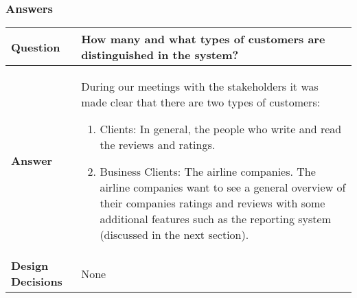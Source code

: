 \subsubsection{Answers}
\begin{longtable}{| l |  p{12cm} |}
\hline
\textbf{Question} & \textbf{How many and what types of customers are distinguished in the system?} \\ \hline
\textbf{Answer} & During our meetings with the stakeholders it was made clear that there are two types of customers:
	\begin{enumerate} 
	\item Clients: In general, the people who write and read the reviews and ratings.
	\item Business Clients: The airline companies. The airline companies want to see a general overview of their companies ratings 			and reviews with some additional features such as the 
	reporting system (discussed in the next section).
	\end{enumerate} \\ \hline
\textbf{Design Decisions} & None \\ \hline
\end{longtable}

